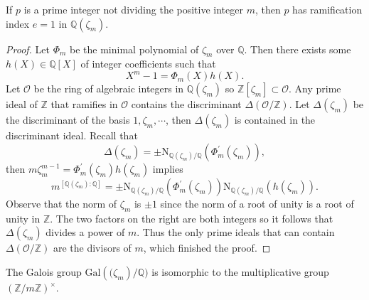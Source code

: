 \begin{proposition}
If $p$ is a prime integer not dividing the positive integer $m$, then $p$ has ramification index $e=1$ in $\mathbb{Q}(\zeta_m)$.
\end{proposition}
\begin{proof}
Let $\Phi_m$ be the minimal polynomial of $\zeta_m$ over $\mathbb{Q}$. Then there exists some $h(X)\in\mathbb{Q}[X]$ of integer coefficients such that 
$$
X^m-1=\Phi _m\left( X \right) h\left( X \right) .
$$
Let $\mathcal{O}$ be the ring of algebraic integers in $\mathbb{Q}(\zeta_m)$ so $\mathbb{Z}[\zeta_m]\subset\mathcal{O}$. Any prime ideal of $\mathbb{Z}$ that ramifies in $\mathcal{O}$ contains the discriminant $\Delta(\mathcal{O}/\mathbb{Z})$. Let $\Delta(\zeta_m)$ be the discriminant of the basis $1,\zeta_m,\cdots$, then $\Delta(\zeta_m)$ is contained in the discriminant ideal. Recall that 
$$
\Delta \left( \zeta _m \right) =\pm \mathrm{N}_{\mathbb{Q} \left( \zeta _m \right) /\mathbb{Q}}\left( \Phi _{m}^{\prime}\left( \zeta _m \right) \right) ,
$$
then $m\zeta _{m}^{m-1}=\Phi _{m}^{\prime}\left( \zeta _m \right) h\left( \zeta _m \right) $ implies 
$$
m^{\left[ \mathbb{Q} \left( \zeta _m \right) :\mathbb{Q} \right]}=\pm \mathrm{N}_{\mathbb{Q} \left( \zeta _m \right) /\mathbb{Q}}\left( \Phi _{m}^{\prime}\left( \zeta _m \right) \right) \mathrm{N}_{\mathbb{Q} \left( \zeta _m \right) /\mathbb{Q}}\left( h\left( \zeta _m \right) \right) .
$$
Observe that the norm of $\zeta_m$ is $\pm 1$ since the norm of a root of unity is a root of unity in $\mathbb{Z}$. The two factors on the right are both integers so it follows that $\Delta(\zeta_m)$ divides a power of $m$. Thus the only prime ideals that can contain $\Delta(\mathcal{O}/\mathbb{Z})$ are the divisors of $m$, which finished the proof.
\end{proof}
\begin{theorem}
The Galois group $\mathrm{Gal}(\mathbb(\zeta_m)/\mathbb{Q})$ is isomorphic to the multiplicative group $(\mathbb{Z}/m\mathbb{Z})^\times$.
\end{theorem}
